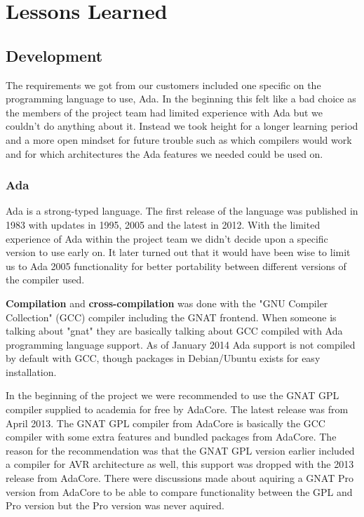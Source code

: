 \section{Lessons Learned}\label{sec:lessons_learned}

\subsection{Development}
The requirements we got from our customers included one specific on the
programming language to use, Ada. In the beginning this felt like a bad choice
as the members of the project team had limited experience with Ada but we
couldn't do anything about it. Instead we took height for a longer learning
period and a more open mindset for future trouble such as which compilers would work
and for which architectures the Ada features we needed could be used on.

\subsubsection{Ada}
Ada is a strong-typed language. The first release of the language was published
in 1983 with updates in 1995, 2005 and the latest in 2012. With the limited
experience of Ada within the project team we didn't decide upon a specific version
to use early on. It later turned out that it would have been wise to limit us to
Ada 2005 functionality for better portability between different versions of
the compiler used.

\textbf{Compilation} and \textbf{cross-compilation} was done with the
"GNU Compiler Collection" (GCC) compiler including the GNAT frontend. When
someone is talking about "gnat" they are basically talking about GCC compiled
with Ada programming language support. As of January 2014 Ada support is not compiled
by default with GCC, though packages in Debian/Ubuntu exists for easy installation.

In the beginning of the project we were recommended to use the GNAT GPL compiler
supplied to academia for free by AdaCore. The latest release was from April
2013. The GNAT GPL compiler from AdaCore is basically the GCC compiler with
some extra features and bundled packages from AdaCore. The reason for the
recommendation was that the GNAT GPL version earlier included a compiler for
AVR architecture as well, this support was dropped with the 2013 release from
AdaCore. There were discussions made about aquiring a GNAT Pro version from AdaCore to
be able to compare functionality between the GPL and Pro version but the Pro 
version was never aquired.

